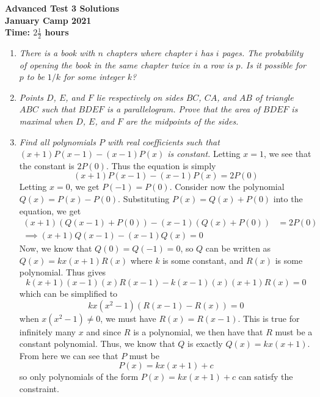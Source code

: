 \documentclass{article}
\begin{document}
\thispagestyle{empty}

\begin{center}
  \textbf{\Large Advanced Test 3 Solutions}
  \\ \vspace{1em}
  \textbf{\large January Camp 2021}
  \\ \vspace{1em}
  \textbf{\large Time: $2\frac{1}{2}$ hours}
\end{center}

\vspace{12pt}

\begin{enumerate}[1.]

\item %
{\itshape There is a book with $n$ chapters where chapter $i$ has $i$ pages.
The probability of opening the book in the same chapter twice in a row is $p$.
Is it possible for $p$ to be $1/k$ for some integer $k$?}


\item %
{\itshape Points $D$, $E$, and $F$ lie respectively on sides $BC$, $CA$, and $AB$ of triangle $ABC$ such that $BDEF$ is a parallelogram. Prove that the area of $BDEF$ is maximal when $D$, $E$, and $F$ are the midpoints of the sides.}


\item %
{\itshape Find all polynomials $P$ with real coefficients such that $(x + 1)P(x - 1) - (x - 1)P(x)$ is constant.}
Letting $x = 1$, we see that the constant is $2P(0)$. Thus the equation is simply
$$(x + 1)P(x - 1) - (x - 1)P(x) = 2P(0) $$
Letting $x = 0$, we get $P(-1) = P(0)$. Consider now the polynomial $Q(x) = P(x) - P(0)$. Substituting $P(x) = Q(x) + P(0)$ into the equation, we get
\begin{align*}
  (x + 1)(Q(x - 1) + P(0)) - (x - 1)(Q(x) + P(0)) &= 2P(0) \\
  \implies (x + 1)Q(x - 1) - (x - 1)Q(x) = 0
\end{align*}
Now, we know that $Q(0) = Q(-1) = 0$, so $Q$ can be written as $Q(x) = kx(x + 1)R(x)$ where $k$ is some constant, and $R(x)$ is some polynomial. Thus gives 
$$k(x + 1)(x - 1)(x)R(x - 1) - k(x - 1)(x)(x + 1)R(x) = 0 $$
which can be simplified to
$$kx(x^2 - 1)(R(x - 1) - R(x)) = 0$$
when $x(x^2 - 1) \ne 0$, we must have $R(x) = R(x - 1)$. This is true for infinitely many $x$ and since $R$ is a polynomial, we then have that $R$ must be a constant polynomial. Thus, we know that $Q$ is exactly $Q(x) = kx(x + 1)$. From here we can see that $P$ must be
$$P(x) = kx(x + 1) + c$$
so only polynomials of the form $P(x) = kx(x + 1) + c$ can satisfy the constraint.


\end{enumerate}
\end{document}
